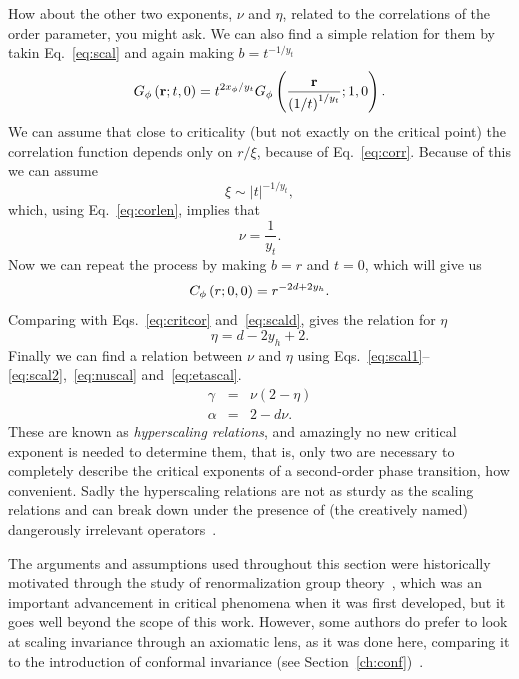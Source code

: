 How about the other two exponents, $\nu$ and $\eta$, related to the
correlations of the order parameter, you might ask. We can also find a simple
relation for them by takin Eq.~\ref{eq:scal} and again making $b=t^{-1/y_t}$
\begin{equation}
    G_{\phi}\left(\mathbf{r};t,0\right)=
    t^{2x_{\phi}/y_{t}}G_{\phi}
    \left(\frac{\mathbf{r}}{{\left(1/t\right)}^{1/y_{t}}};1,0\right).
\end{equation}
We can assume that close to criticality (but not exactly on the critical point)
the correlation function depends only on $r/\xi$, because of
Eq.~\ref{eq:corr}. Because of this we can assume
\begin{equation}
    \xi\sim\left|t\right|^{-1/y_t},
\end{equation}
which, using Eq.~\ref{eq:corlen}, implies that
\begin{equation}
    \label{eq:nuscal}
    \nu=\frac{1}{y_t}.
\end{equation}
Now we can repeat the process by making $b=r$ and $t=0$, which will give us
\begin{equation}
    C_{\phi}\left(r;0,0\right)=r^{-2d+2y_{h}}.
\end{equation}
Comparing with Eqs.~\ref{eq:critcor} and~\ref{eq:scald}, gives the relation for
$\eta$
\begin{equation}
    \label{eq:etascal}
    \eta=d-2y_h+2.
\end{equation}
Finally we can find a relation between $\nu$ and $\eta$ using
Eqs.~\ref{eq:scal1}--\ref{eq:scal2},~\ref{eq:nuscal} and~\ref{eq:etascal}.
\begin{eqnarray}
    \label{eq:hs1}
    \gamma & = & \nu\left(2-\eta\right)\\
    \label{eq:hs2}
    \alpha & = & 2-d\nu.
\end{eqnarray}
These are known as \textit{hyperscaling relations}, and amazingly no new
critical exponent is needed to determine them, that is, only two are necessary
to completely describe the critical exponents of a second-order phase
transition, how convenient. Sadly the hyperscaling relations are not as sturdy
as the scaling relations and can break down under the presence of (the
creatively named) dangerously irrelevant operators~\cite{Nishimori2011}.

The arguments and assumptions used throughout this section were historically
motivated through the study of renormalization group
theory~\cite{Pelissetto2002}, which was an important advancement in critical
phenomena when it was first developed, but it goes well beyond the scope of
this work. However, some authors do prefer to look at scaling invariance
through an axiomatic lens, as it was done here, comparing it to the
introduction of conformal invariance (see
Section~\ref{ch:conf})~\cite{Henkel2013}.


